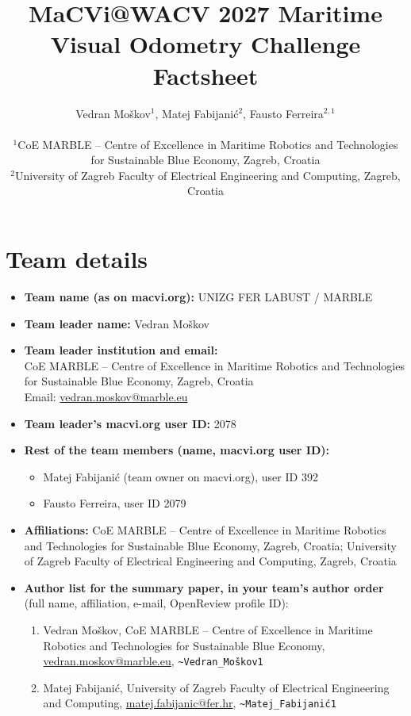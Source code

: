 \documentclass[11pt]{article}
\title{MaCVi@WACV 2027 Maritime Visual Odometry Challenge\\Factsheet}
\author{Vedran Mo\v{s}kov$^{1}$, Matej Fabijani\'c$^{2}$, Fausto Ferreira$^{2,1}$\\[4pt]
\parbox{0.9\textwidth}{\centering\normalsize
$^{1}$CoE MARBLE -- Centre of Excellence in Maritime Robotics and Technologies for Sustainable Blue Economy,
Zagreb, Croatia\\
$^{2}$University of Zagreb Faculty of Electrical Engineering and Computing, Zagreb, Croatia}}
\date{}
\begin{document}
\maketitle

\section{Team details}\label{sec:team}
\begin{itemize}
  \item \textbf{Team name (as on macvi.org):} UNIZG FER LABUST / MARBLE
  \item \textbf{Team leader name:} Vedran Mo\v{s}kov
  \item \textbf{Team leader institution and email:}\\
    CoE MARBLE -- Centre of Excellence in Maritime Robotics and Technologies for Sustainable Blue Economy, Zagreb, Croatia\\
    Email: \href{mailto:vedran.moskov@marble.eu}{vedran.moskov@marble.eu}
  \item \textbf{Team leader's macvi.org user ID:} 2078
  \item \textbf{Rest of the team members (name, macvi.org user ID):}
    \begin{itemize}
      \item[--] Matej Fabijani\'c (team owner on macvi.org), user ID 392
      \item[--] Fausto Ferreira, user ID 2079
    \end{itemize}
  \item \textbf{Affiliations:} CoE MARBLE -- Centre of Excellence in Maritime Robotics and Technologies for Sustainable Blue Economy, Zagreb, Croatia; University of Zagreb Faculty of Electrical Engineering and Computing, Zagreb, Croatia
  \item \textbf{Author list for the summary paper, in your team's author order} (full name, affiliation, e-mail, OpenReview profile ID):
    \begin{enumerate}
      \item Vedran Mo\v{s}kov, CoE MARBLE -- Centre of Excellence in Maritime Robotics and Technologies for Sustainable Blue Economy, \href{mailto:vedran.moskov@marble.eu}{vedran.moskov@marble.eu},
        \texttt{\textasciitilde Vedran\_Mo\v{s}kov1}
      \item Matej Fabijani\'c, University of Zagreb Faculty of Electrical Engineering and Computing, \href{mailto:matej.fabijanic@fer.hr}{matej.fabijanic@fer.hr},
        \texttt{\textasciitilde Matej\_Fabijani\'c1}

\end{enumerate}
\end{itemize}
\end{document}
